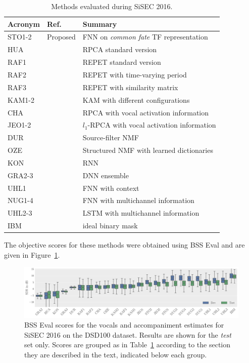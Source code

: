 \begin{table}[htbp]
	\centering
	\caption{Methods evaluated during SiSEC 2016.}
	\label{tab:systems}
	\begin{tabular}{lll@{}}
		\hline
		\textbf{Acronym} & \textbf{Ref.} & \textbf{Summary}\\
		\hline
    STO1-2 & Proposed & FNN on \textit{common fate} TF representation \\
		HUA & \cite{huang12} & RPCA standard version \\
		RAF1 & \cite{rafii13} & REPET standard version \\
		RAF2 & \cite{liutkus12} & REPET with time-varying period \\
		RAF3 & \cite{rafii12} & REPET with similarity matrix \\
		KAM1-2 & \cite{liutkus15} & KAM with different configurations \\
		CHA & \cite{chan15} & RPCA with vocal activation information \\
		JEO1-2 & \cite{jeong17} &  $l_1$-RPCA with vocal activation information \\
		DUR & \cite{durrieu11} & Source-filter NMF \\
		OZE & \cite{salaun14} & Structured NMF with learned dictionaries \\
		KON & \cite{huang15} & RNN \\
		GRA2-3 & \cite{grais16} & DNN ensemble \\
		UHL1 & \cite{uhlich15} & FNN with context \\
		NUG1-4 & \cite{nugraha16} & FNN with multichannel information \\
		UHL2-3 & \cite{uhlich17} & LSTM with multichannel information \\
		IBM & & ideal binary mask \\
	\end{tabular}
\end{table}

The objective scores for these methods were obtained using BSS Eval and are given in Figure~\ref{fig:eval}.

\begin{figure}[htbp]
	\includegraphics[width=\textwidth]{gfx/vocalsSDR.pdf}
	\caption{BSS Eval scores for the vocals and accompaniment estimates for SiSEC 2016 on the DSD100 dataset. Results are  shown for the \emph{test} set only. Scores are grouped as in Table~\ref{tab:systems} according to the section they are described in the text, indicated below each group.}
	\label{fig:eval}
\end{figure}

